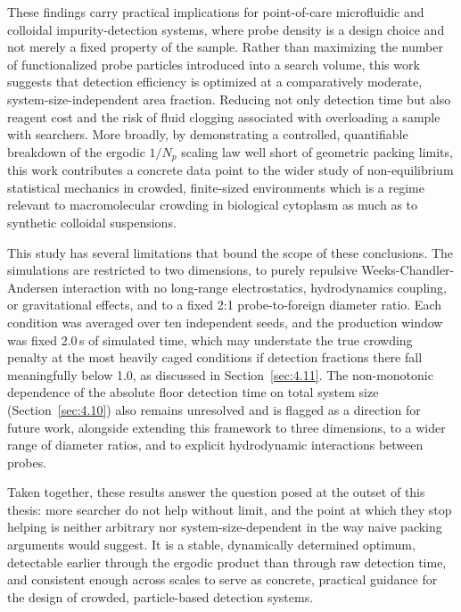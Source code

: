 
These findings carry practical implications for point-of-care microfluidic and colloidal impurity-detection systems, where probe density is a design choice and not merely a fixed property of the sample. Rather than maximizing the number of functionalized probe particles introduced into a search volume, this work suggests that detection efficiency is optimized at a comparatively moderate, system-size-independent area fraction. Reducing not only detection time but also reagent cost and the risk of fluid clogging associated with overloading a sample with searchers. More broadly, by demonstrating a controlled, quantifiable breakdown of the ergodic $1/N_p$ scaling law well short of geometric packing limits, this work contributes a concrete data point to the wider study of non-equilibrium statistical mechanics in crowded, finite-sized environments which is a regime relevant to macromolecular crowding in biological cytoplasm as much as to synthetic colloidal suspensions.

This study has several limitations that bound the scope of these conclusions. The simulations are restricted to two dimensions, to purely repulsive Weeks-Chandler-Andersen interaction with no long-range electrostatics, hydrodynamics coupling, or gravitational effects, and to a fixed 2:1 probe-to-foreign diameter ratio. Each condition was averaged over ten independent seeds, and the production window was fixed 2.0\,s of simulated time, which may understate the true crowding penalty at the most heavily caged conditions if detection fractions there fall meaningfully below 1.0, as discussed in Section~\ref{sec:4.11}. The non-monotonic dependence of the absolute floor detection time on total system size (Section~\ref{sec:4.10}) also remains unresolved and is flagged as a direction for future work, alongside extending this framework to three dimensions, to a wider range of diameter ratios, and to explicit hydrodynamic interactions between probes.

Taken together, these results answer the question posed at the outset of this thesis: more searcher do not help without limit, and the point at which they stop helping is neither arbitrary  nor system-size-dependent in the way naive packing arguments would suggest. It is a stable, dynamically determined optimum, detectable earlier through the ergodic product than through raw detection time, and consistent enough across scales to serve as concrete, practical guidance for the design of crowded, particle-based detection systems.
